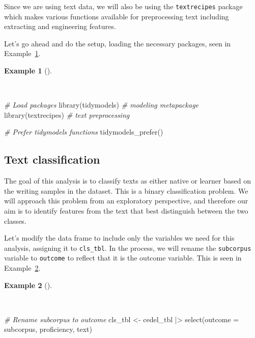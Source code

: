 \documentclass[
  letterpaper,
]{latex/krantz}
\newenvironment{Shaded}{\begin{snugshade}}{\end{snugshade}}
\newcommand{\AttributeTok}[1]{\textcolor[rgb]{0.00,0.00,0.00}{#1}}
\newcommand{\CommentTok}[1]{\textcolor[rgb]{0.00,0.00,0.00}{\textit{#1}}}
\newcommand{\FunctionTok}[1]{\textcolor[rgb]{0.00,0.00,0.00}{#1}}
\newcommand{\NormalTok}[1]{\textcolor[rgb]{0.00,0.00,0.00}{#1}}
\newcommand{\OtherTok}[1]{\textcolor[rgb]{0.00,0.00,0.00}{#1}}
\newcommand{\SpecialCharTok}[1]{\textcolor[rgb]{0.00,0.00,0.00}{#1}}
\theoremstyle{definition}
\newtheorem{example}{Example}[chapter]
\theoremstyle{remark}
\begin{document}
Since we are using text data, we will also be using the
\texttt{textrecipes} package which makes various functions available for
preprocessing text including extracting and engineering features.

Let's go ahead and do the setup, loading the necessary packages, seen in
Example~\ref{exm-pda-packages-data}.

\begin{example}[]\protect\hypertarget{exm-pda-packages-data}{}\label{exm-pda-packages-data}

~

\begin{Shaded}
\begin{Highlighting}[]
\CommentTok{\# Load packages}
\FunctionTok{library}\NormalTok{(tidymodels)   }\CommentTok{\# modeling metapackage}
\FunctionTok{library}\NormalTok{(textrecipes)  }\CommentTok{\# text preprocessing}

\CommentTok{\# Prefer tidymodels functions}
\FunctionTok{tidymodels\_prefer}\NormalTok{()}
\end{Highlighting}
\end{Shaded}

\end{example}

\subsection{Text classification}\label{sec-pda-text-classification}

The goal of this analysis is to classify texts as either native or
learner based on the writing samples in the dataset. This is a binary
classification problem. We will approach this problem from an
exploratory perspective, and therefore our aim is to identify features
from the text that best distinguish between the two classes.

Let's modify the data frame to include only the variables we need for
this analysis, assigning it to \texttt{cls\_tbl}. In the process, we
will rename the \texttt{subcorpus} variable to \texttt{outcome} to
reflect that it is the outcome variable. This is seen in
Example~\ref{exm-pda-class-data}.

\begin{example}[]\protect\hypertarget{exm-pda-class-data}{}\label{exm-pda-class-data}

~

\begin{Shaded}
\begin{Highlighting}[]
\CommentTok{\# Rename subcorpus to outcome}
\NormalTok{cls\_tbl }\OtherTok{\textless{}{-}}
\NormalTok{  cedel\_tbl }\SpecialCharTok{|\textgreater{}}
  \FunctionTok{select}\NormalTok{(}\AttributeTok{outcome =}\NormalTok{ subcorpus, proficiency, text)}
\end{Highlighting}
\end{Shaded}

\end{example}
\end{document}
